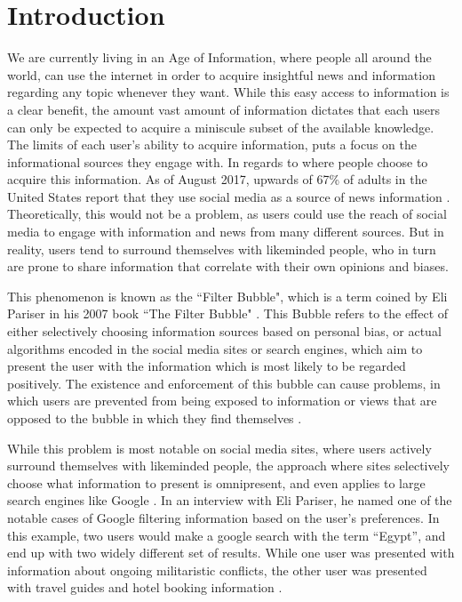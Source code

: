 \chapter{Introduction}
We are currently living in an Age of Information, where people all around the
world, can use the internet in order to acquire insightful news and information
regarding any topic whenever they want. While this easy access to information is
a clear benefit, the amount vast amount of information dictates that each
users can only be expected to acquire a miniscule subset of the available
knowledge.\\
The limits of each user's ability to acquire information, puts a focus on the
informational sources they engage with. In regards to where people choose to
acquire this information. As of August 2017, upwards of 67\% of adults in the
United States report that they use social media as a source of news
information \citep{journalism2017}. Theoretically, this would not be a problem,
as users could use the reach of social media to engage with information and
news from many different sources. But in reality, users tend to surround
themselves with likeminded people, who in turn are prone to share information
that correlate with their own opinions and biases.\nl

This phenomenon is known as the ``Filter Bubble", which is a term coined by Eli
Pariser in his 2007 book ``The Filter Bubble" \citep{pariser2011filter}. This
Bubble refers to the effect of either selectively choosing information sources
based on personal bias, or actual algorithms encoded in the social media sites
or search engines, which aim to present the user with the information which is
most likely to be regarded positively. The existence and enforcement of this
bubble can cause problems, in which users are prevented from being exposed to
information or views that are opposed to the bubble in which they find
themselves \citep[p.59-73]{pariser2011filter}.\nl

While this problem is most notable on social media sites, where users actively
surround themselves with likeminded people, the approach where sites selectively
choose what information to present is omnipresent, and even applies to large
search engines like Google \citep{filterBubbleDef}. In an interview with Eli
Pariser, he named one of the notable cases of Google filtering information based
on the user's preferences. In this example, two users would make a google search
with the term ``Egypt'', and end up with two widely different set of results.
While one user was presented with information about ongoing militaristic
conflicts, the other user was presented with travel guides and hotel booking
information \citep{nusSduSearch}.
